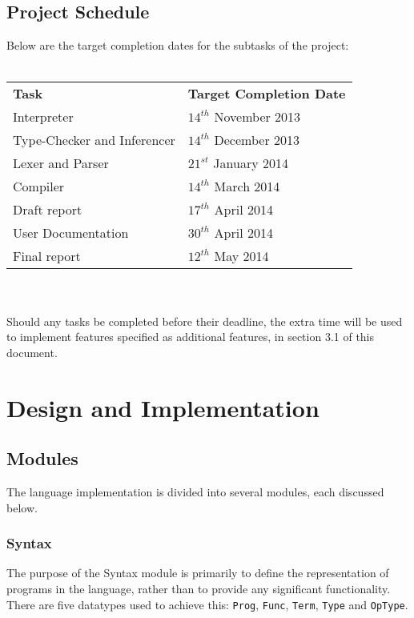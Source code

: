 \documentclass{article}
\begin{document}
\subsection{Project Schedule}
Below are the target completion dates for the subtasks of the project:
\\\\
\begin{tabular}{l l}
    \indent \textbf{Task}               & \textbf{Target Completion Date} \\
    \indent Interpreter                 & $14^{th}$ November 2013         \\
    \indent Type-Checker and Inferencer & $14^{th}$ December 2013         \\
    \indent Lexer and Parser            & $21^{st}$ January  2014         \\
    \indent Compiler                    & $14^{th}$ March    2014         \\
    \indent Draft report                & $17^{th}$ April    2014         \\
    \indent User Documentation          & $30^{th}$ April    2014         \\
    \indent Final report                & $12^{th}$ May      2014         \\
\end{tabular}
\\\\
Should any tasks be completed before their deadline, the extra time will be used to implement features specified as additional features, in section 3.1 of this document.

\pagebreak
\section{Design and Implementation}
\subsection{Modules}
The language implementation is divided into several modules, each discussed below.
\subsubsection{Syntax}
The purpose of the Syntax module is primarily to define the representation of programs in the language, rather than to provide any significant functionality. There are five datatypes used to achieve this: \texttt{Prog}, \texttt{Func}, \texttt{Term}, \texttt{Type} and \texttt{OpType}.
\end{document}

